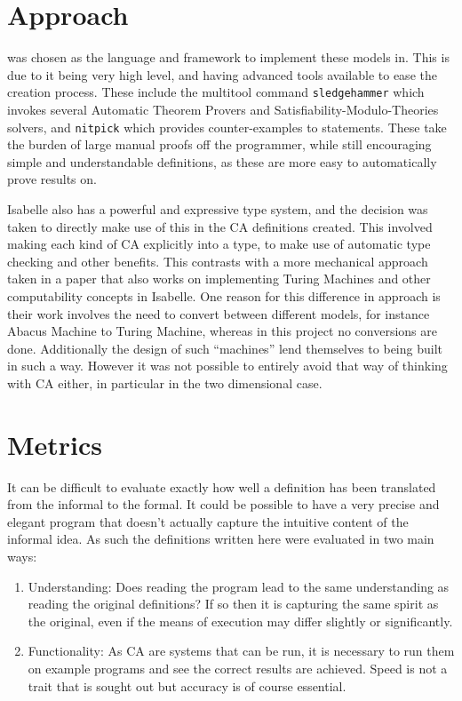 \section{Approach}

 was chosen as the language and framework to implement these models in.
This is due to it being very high level,
and having advanced tools available to ease the creation process.
These include the multitool command \texttt{sledgehammer} which invokes several Automatic Theorem Provers and Satisfiability-Modulo-Theories solvers, and \texttt{nitpick} which provides counter-examples to statements.
These take the burden of large manual proofs off the programmer,
while still encouraging simple and understandable definitions,
as these are more easy to automatically prove results on.

Isabelle also has a powerful and expressive type system,
and the decision was taken to directly make use of this in the CA definitions created.
This involved making each kind of CA explicitly into a type,
to make use of automatic type checking and other benefits.
This contrasts with a more mechanical approach taken in a paper \cite{urban} that also works on implementing Turing Machines and other computability concepts in Isabelle.
One reason for this difference in approach is their work involves the need to convert between different models, for instance Abacus Machine to Turing Machine,
whereas in this project no conversions are done.
Additionally the design of such ``machines'' lend themselves to being built in such a way.
However it was not possible to entirely avoid that way of thinking with CA either, in particular in the two dimensional case.


\section{Metrics} \label{sec:metrics}

It can be difficult to evaluate exactly how well a definition has been translated from the informal to the formal.
It could be possible to have a very precise and elegant program that doesn't actually capture the intuitive content of the informal idea.
As such the definitions written here were evaluated in two main ways:

\begin{enumerate}
    \item Understanding: Does reading the program lead to the same understanding as reading the original definitions?
        If so then it is capturing the same spirit as the original,
        even if the means of execution may differ slightly or significantly.
    \item Functionality: As CA are systems that can be run,
        it is necessary to run them on example programs and see the correct results are achieved.
        Speed is not a trait that is sought out but accuracy is of course essential.
\end{enumerate}

